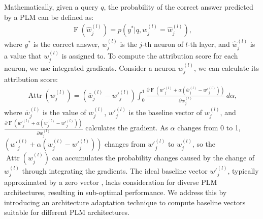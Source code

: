 \documentclass[]{article}
\begin{document}
Mathematically, given a query $q$, the probability of the correct answer predicted by a PLM can be defined as:
{\small \begin{align}
\label{eq:1}
      \operatorname{F}(\hat{w}^{(l)}_{j}) = p(y^* | q, w^{(l)}_{j}=\hat{w}^ {(l)}_{j}),
\end{align}}where $y^*$ is the correct answer, ${w}^{(l)}_{j}$ is the $j$-th neuron of $l$-th layer, and $\hat{w}^ {(l)}_{j}$ is a value that ${w}^ {(l)}_{j}$ is assigned to. To compute the attribution score for each neuron, we use integrated gradients\cite{ig}. Consider a neuron ${w}^ {(l)}_{j}$, we can calculate its attribution score:
{\small 
\begin{align}
    \label{eqution:attribute}
     \operatorname{Attr}({w}^{(l)}_{j}) = (\overline{w}^{(l)}_{j} - {w'}^{(l)}_{j}) \int_{0}^{1} \frac{\partial \operatorname{F}({w'}^{(l)}_{j} + \alpha(\overline{w}^{(l)}_{j} - {w'}^{(l)}_{j}))}{\partial {w}^{(l)}_{j}}  \, d\alpha,
\end{align}}where $\overline{w}^{(l)}_{j}$ is the value of ${w}^{(l)}_{j}$, ${w'}^{(l)}_{j}$ is the baseline vector of ${w}^{(l)}_{j}$, and $\frac{\partial \operatorname{F}({w'}^{(l)}_{j} + \alpha({w}^{(l)}_{j} - {w'}^{(l)}_{j}))}{\partial {w}^{(l)}_{j}}$ calculates the gradient. As $\alpha$ changes from 0 to 1, $({w'}^{(l)}_{j} + \alpha({w}^{(l)}_{j} - {w'}^{(l)}_{j}))$ changes from ${w'}^{(l)}_{j}$ to ${w}^{(l)}_{j}$, so the $\operatorname{Attr}({w}^{(l)}_{j})$ can accumulates the probability changes caused by the change of ${w}^{(l)}_{j}$ through integrating the gradients.
The ideal baseline vector ${w'}^{(l)}_{j}$, typically approximated by a zero vector \cite{transparent}, lacks consideration for diverse PLM architectures, resulting in sub-optimal performance. We address this by introducing an architecture adaptation technique to compute baseline vectors suitable for different PLM architectures.
\end{document}
